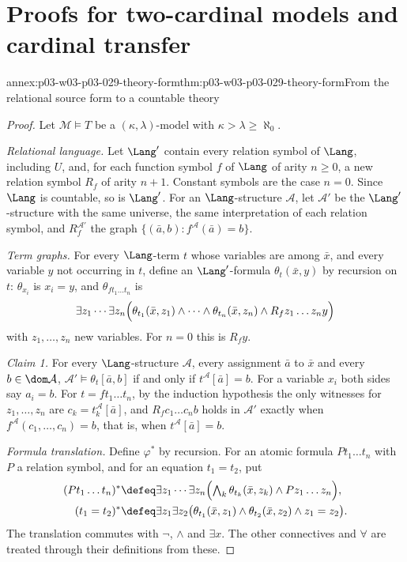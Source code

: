 \section{Proofs for two-cardinal models and cardinal transfer}
\label{sec:annex-p03-w03-p03-029}

\begin{annexitem}{annex:p03-w03-p03-029-theory-form}{thm:p03-w03-p03-029-theory-form}{From the relational source form to a countable theory}
\begin{proof}
Let \(\mathcal M\models T\) be a \((\kappa,\lambda)\)-model with
\(\kappa>\lambda\geq\aleph_0\).

\emph{Relational language.} Let \(\Lang'\) contain every relation symbol of
\(\Lang\), including \(U\), and, for each function symbol \(f\) of \(\Lang\)
of arity \(n\geq0\), a new relation symbol \(R_f\) of arity \(n+1\). Constant
symbols are the case \(n=0\). Since \(\Lang\) is countable, so is
\(\Lang'\). For an \(\Lang\)-structure \(\mathcal A\), let \(\mathcal A'\) be
the \(\Lang'\)-structure with the same universe, the same interpretation of
each relation symbol, and \(R_f^{\mathcal A'}\) the graph
\(\{(\bar a,b):f^{\mathcal A}(\bar a)=b\}\).

\emph{Term graphs.} For every \(\Lang\)-term \(t\) whose variables are among
\(\bar x\), and every variable \(y\) not occurring in \(t\), define an
\(\Lang'\)-formula \(\theta_t(\bar x,y)\) by recursion on \(t\):
\(\theta_{x_i}\) is \(x_i=y\), and \(\theta_{f t_1\ldots t_n}\) is
\[
  \exists z_1\cdots\exists z_n\Bigl(\theta_{t_1}(\bar x,z_1)\wedge\cdots
  \wedge\theta_{t_n}(\bar x,z_n)\wedge R_f z_1\ldots z_n y\Bigr)
\]
with \(z_1,\ldots,z_n\) new variables. For \(n=0\) this is \(R_f y\).

\emph{Claim 1.} For every \(\Lang\)-structure \(\mathcal A\), every
assignment \(\bar a\) to \(\bar x\) and every \(b\in\dom\mathcal A\),
\(\mathcal A'\models\theta_t[\bar a,b]\) if and only if
\(t^{\mathcal A}[\bar a]=b\). For a variable \(x_i\) both sides say
\(a_i=b\). For \(t=f t_1\ldots t_n\), by the induction hypothesis the only
witnesses for \(z_1,\ldots,z_n\) are \(c_k=t_k^{\mathcal A}[\bar a]\), and
\(R_f c_1\ldots c_n b\) holds in \(\mathcal A'\) exactly when
\(f^{\mathcal A}(c_1,\ldots,c_n)=b\), that is, when
\(t^{\mathcal A}[\bar a]=b\).

\emph{Formula translation.} Define \(\varphi^*\) by recursion. For an atomic
formula \(P t_1\ldots t_n\) with \(P\) a relation symbol, and for an
equation \(t_1=t_2\), put
\begin{align*}
  (P t_1\ldots t_n)^* &\defeq \exists z_1\cdots\exists z_n
     \Bigl(\textstyle\bigwedge_k\theta_{t_k}(\bar x,z_k)\wedge
     P z_1\ldots z_n\Bigr),\\
  (t_1=t_2)^* &\defeq \exists z_1\exists z_2
     \bigl(\theta_{t_1}(\bar x,z_1)\wedge\theta_{t_2}(\bar x,z_2)
     \wedge z_1=z_2\bigr).
\end{align*}
The translation commutes with \(\neg\), \(\wedge\) and \(\exists x\). The other connectives and \(\forall\) are treated through
their definitions from these.


\end{proof}
\end{annexitem}
